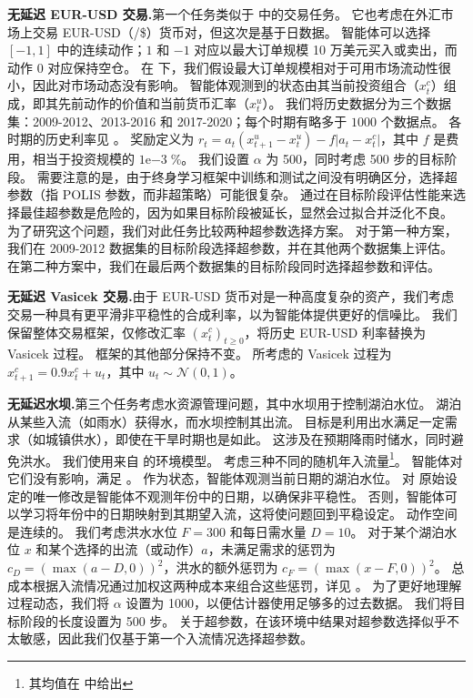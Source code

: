 \noindent\textbf{无延迟 EUR-USD 交易.}\indent 第一个任务类似于  中的交易任务。
它也考虑在外汇市场上交易 EUR-USD（\texteuro/\$）货币对，但这次是基于日数据。
智能体可以选择 $[-1,1]$ 中的连续动作；$1$ 和 $-1$ 对应以最大订单规模 10 万美元买入或卖出，而动作 $0$ 对应保持空仓。
在  下，我们假设最大订单规模相对于可用市场流动性很小，因此对市场动态没有影响。
智能体观测到的状态由其当前投资组合（$x_{t}^{c}$）组成，即其先前动作的价值和当前货币汇率（$x_{t}^{u}$）。
我们将历史数据分为三个数据集：2009-2012、2013-2016 和 2017-2020；每个时期有略多于 $1000$ 个数据点。
各时期的历史利率见 。
奖励定义为 $r_{t}=a_t(x_{t+1}^{u}-x_{t}^{u})-f\lvert a_t - x_{t}^{c}\rvert$，其中 $f$ 是费用，相当于投资规模的 $1\mathrm{e}{-3}\;\%$。
我们设置 $\alpha$ 为 500，同时考虑 500 步的目标阶段。
需要注意的是，由于终身学习框架中训练和测试之间没有明确区分，选择超参数（指 POLIS 参数，而非超策略）可能很复杂。
通过在目标阶段评估性能来选择最佳超参数是危险的，因为如果目标阶段被延长，显然会过拟合并泛化不良。
为了研究这个问题，我们对此任务比较两种超参数选择方案。
对于第一种方案，我们在 2009-2012 数据集的目标阶段选择超参数，并在其他两个数据集上评估。
在第二种方案中，我们在最后两个数据集的目标阶段同时选择超参数和评估。

\noindent\textbf{无延迟 Vasicek 交易.}\indent 由于 EUR-USD 货币对是一种高度复杂的资产，我们考虑交易一种具有更平滑非平稳性的合成利率，以为智能体提供更好的信噪比。
我们保留整体交易框架，仅修改汇率 $(x_{t}^{c})_{t\ge0}$，将历史 EUR-USD 利率替换为 Vasicek 过程。
框架的其他部分保持不变。
所考虑的 Vasicek 过程为 $x_{t+1}^{c} = 0.9 x_{t}^{c} + u_t$，其中 $u_t\sim\mathcal{N}(0,1)$。

\noindent\textbf{无延迟水坝.}\indent 第三个任务考虑水资源管理问题，其中水坝用于控制湖泊水位。
湖泊从某些入流（如雨水）获得水，而水坝控制其出流。
目标是利用出水满足一定需求（如城镇供水），即使在干旱时期也是如此。
这涉及在预期降雨时储水，同时避免洪水。
我们使用来自 \cite{castelletti2010tree, pmlr-v80-tirinzoni18a} 的环境模型。
考虑三种不同的随机年入流量\footnote{其均值在  中给出}。
智能体对它们没有影响，满足 。
作为状态，智能体观测当前日期的湖泊水位。
对 \cite{castelletti2010tree, pmlr-v80-tirinzoni18a} 原始设定的唯一修改是智能体不观测年份中的日期，以确保非平稳性。
否则，智能体可以学习将年份中的日期映射到其期望入流，这将使问题回到平稳设定。
动作空间是连续的。
我们考虑洪水水位 $F=300$ 和每日需水量 $D=10$。
对于某个湖泊水位 $x$ 和某个选择的出流（或动作）$a$，未满足需求的惩罚为 $c_D = (\max(a-D,0))^2$，洪水的额外惩罚为 $c_F = (\max(x-F,0))^2$。
总成本根据入流情况通过加权这两种成本来组合这些惩罚，详见 。
为了更好地理解过程动态，我们将 $\alpha$ 设置为 1000，以便估计器使用足够多的过去数据。
我们将目标阶段的长度设置为 500 步。
关于超参数，在该环境中结果对超参数选择似乎不太敏感，因此我们仅基于第一个入流情况选择超参数。

